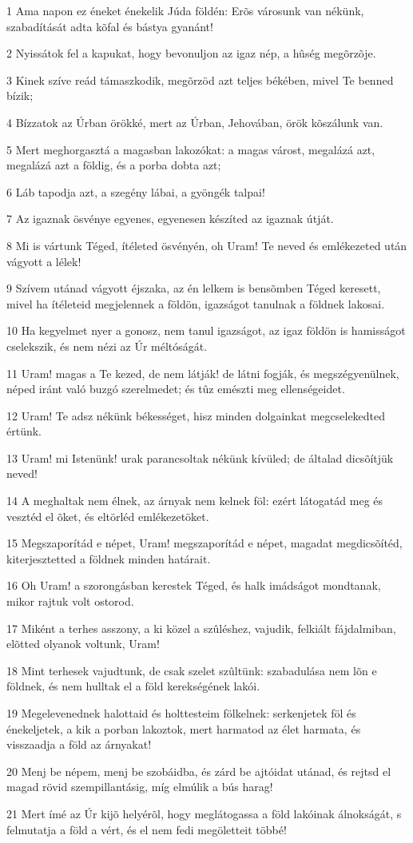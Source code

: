 \par 1 Ama napon ez éneket énekelik Júda földén: Erõs városunk van nékünk, szabadítását adta kõfal és bástya gyanánt!
\par 2 Nyissátok fel a kapukat, hogy bevonuljon az igaz nép, a hûség megõrzõje.
\par 3 Kinek szíve reád támaszkodik, megõrzöd azt teljes békében, mivel Te benned bízik;
\par 4 Bízzatok az Úrban örökké, mert az Úrban, Jehovában, örök kõszálunk van.
\par 5 Mert meghorgasztá a magasban lakozókat: a magas várost, megalázá azt, megalázá azt a földig, és a porba dobta azt;
\par 6 Láb tapodja azt, a szegény lábai, a gyöngék talpai!
\par 7 Az igaznak ösvénye egyenes, egyenesen készíted az igaznak útját.
\par 8 Mi is vártunk Téged, ítéleted ösvényén, oh Uram! Te neved és emlékezeted után vágyott a lélek!
\par 9 Szívem utánad vágyott éjszaka, az én lelkem is bensõmben Téged keresett, mivel ha ítéleteid megjelennek a földön, igazságot tanulnak a földnek lakosai.
\par 10 Ha kegyelmet nyer a gonosz, nem tanul igazságot, az igaz földön is hamisságot cselekszik, és nem nézi az Úr méltóságát.
\par 11 Uram! magas a Te kezed, de nem látják! de látni fogják, és megszégyenülnek, néped iránt való buzgó szerelmedet; és tûz emészti meg ellenségeidet.
\par 12 Uram! Te adsz nékünk békességet, hisz minden dolgainkat megcselekedted értünk.
\par 13 Uram! mi Istenünk! urak parancsoltak nékünk kívüled; de általad dicsõítjük neved!
\par 14 A meghaltak nem élnek, az árnyak nem kelnek föl: ezért látogatád meg és vesztéd el õket, és eltörléd emlékezetöket.
\par 15 Megszaporítád e népet, Uram! megszaporítád e népet, magadat megdicsõítéd, kiterjesztetted a földnek minden határait.
\par 16 Oh Uram! a szorongásban kerestek Téged, és halk imádságot mondtanak, mikor rajtuk volt ostorod.
\par 17 Miként a terhes asszony, a ki közel a szûléshez, vajudik, felkiált fájdalmiban, elõtted olyanok voltunk, Uram!
\par 18 Mint terhesek vajudtunk, de csak szelet szûltünk: szabadulása nem lõn e földnek, és nem hulltak el a föld kerekségének lakói.
\par 19 Megelevenednek halottaid és holttesteim fölkelnek: serkenjetek föl és énekeljetek, a kik a porban lakoztok, mert harmatod az élet harmata, és visszaadja a föld az árnyakat!
\par 20 Menj be népem, menj be szobáidba, és zárd be ajtóidat utánad, és rejtsd el magad rövid szempillantásig, míg elmúlik a bús harag!
\par 21 Mert ímé az Úr kijõ helyérõl, hogy meglátogassa a föld lakóinak álnokságát, s felmutatja a föld a vért, és el nem fedi megöletteit többé!


